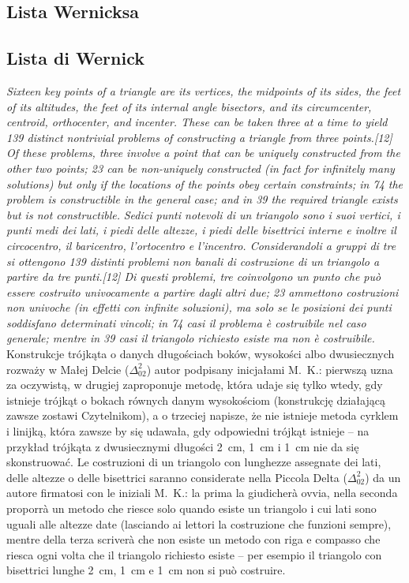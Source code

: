 \subsection{Lista Wernicksa} %
\subsection{Lista di Wernick} %

\emph{Sixteen key points of a triangle are its vertices, the midpoints of its sides, the feet of its altitudes, the feet of its internal angle bisectors, and its circumcenter, centroid, orthocenter, and incenter. These can be taken three at a time to yield 139 distinct nontrivial problems of constructing a triangle from three points.[12] Of these problems, three involve a point that can be uniquely constructed from the other two points; 23 can be non-uniquely constructed (in fact for infinitely many solutions) but only if the locations of the points obey certain constraints; in 74 the problem is constructible in the general case; and in 39 the required triangle exists but is not constructible.} %
\emph{Sedici punti notevoli di un triangolo sono i suoi vertici, i punti medi dei lati, i piedi delle altezze, i piedi delle bisettrici interne e inoltre il circocentro, il baricentro, l'ortocentro e l'incentro. Considerandoli a gruppi di tre si ottengono 139 distinti problemi non banali di costruzione di un triangolo a partire da tre punti.[12] Di questi problemi, tre coinvolgono un punto che può essere costruito univocamente a partire dagli altri due; 23 ammettono costruzioni non univoche (in effetti con infinite soluzioni), ma solo se le posizioni dei punti soddisfano determinati vincoli; in 74 casi il problema è costruibile nel caso generale; mentre in 39 casi il triangolo richiesto esiste ma non è costruibile.} %
Konstrukcje trójkąta o danych długościach boków, wysokości albo dwusiecznych rozważy w Małej Delcie ($\Delta_{02}^{2}$) autor podpisany inicjałami M.~K.: pierwszą uzna za oczywistą, w drugiej zaproponuje metodę, która udaje się tylko wtedy, gdy istnieje trójkąt o bokach równych danym wysokościom (konstrukcję działającą zawsze zostawi Czytelnikom), a o trzeciej napisze, że nie istnieje metoda cyrklem i linijką, która zawsze by się udawała, gdy odpowiedni trójkąt istnieje -- na przykład trójkąta z dwusiecznymi długości 2~cm, 1~cm i 1~cm nie da się skonstruować. %
Le costruzioni di un triangolo con lunghezze assegnate dei lati, delle altezze o delle bisettrici saranno considerate nella Piccola Delta ($\Delta_{02}^{2}$) da un autore firmatosi con le iniziali M.~K.: la prima la giudicherà ovvia, nella seconda proporrà un metodo che riesce solo quando esiste un triangolo i cui lati sono uguali alle altezze date (lasciando ai lettori la costruzione che funzioni sempre), mentre della terza scriverà che non esiste un metodo con riga e compasso che riesca ogni volta che il triangolo richiesto esiste -- per esempio il triangolo con bisettrici lunghe 2~cm, 1~cm e 1~cm non si può costruire. %


%
